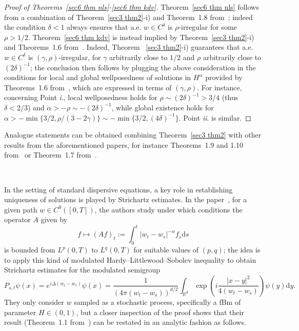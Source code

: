 \documentclass[10pt]{article}
\newcommand{\assign}{:=}
\newcommand{\mathd}{\mathrm{d}}
\begin{document}
\begin{proof}[Proof of Theorems~\ref{sec6 thm nls}\mbox{-}\ref{sec6 thm kdv}]
  Theorem~\ref{sec6 thm nls} follows from a combination of Theorem~\ref{sec3
  thm2}-i) and Theorem~1.8 from~{\cite{choukgubinelli1}}; indeed the condition
  $\delta < 1$ always ensures that a.e. $w \in C^{\delta}$ is $\rho$-irregular
  for some $\rho > 1 / 2$. Theorem~\ref{sec6 thm kdv} is instead implied by
  Theorem~\ref{sec3 thm2}-i) and Theorems~1.6 from~{\cite{choukgubinelli2}}.
  Indeed, Theorem ~\ref{sec3 thm2}-i) guarantees that a.e. $w\in C^\delta$ is $(\gamma,\rho)$-irregular, for $\gamma$ arbitrarily close to $1/2$ and $\rho$ arbitrarily close to $(2\delta)^{-1}$; the conclusion then follows by plugging the above consideration in the conditions for local and global wellposedness of solutions in $H^\alpha$ provided by Theorems~1.6 from~{\cite{choukgubinelli2}}, which are expressed in terms of $(\gamma,\rho)$.
  For instance, concerning Point \textit{i}., local wellposedness holds for $\rho\sim (2\delta)^{-1}>3/4$ (thus $\delta<2/3$) and $\alpha>-\rho\sim -(2\delta)^{-1}$, while global existence holds for $\alpha> -\min\{3/2,\rho/(3-2\gamma)\}\sim -\min\{3/2,(4\delta)^{-1}\}$. Point \textit{ii}. is similar.
\end{proof}

Analogue statements can be obtained combining Theorem~\ref{sec3 thm2} with
other results from the aforementioned papers, for instance Theorems~1.9 and
1.10 from~{\cite{choukgubinelli1}} or Theorem~1.7
from~{\cite{choukgubinelli2}}.

\

In the setting of standard dispersive equations, a key role in establishing
uniqueness of solutions is played by Strichartz estimates. In the
paper~{\cite{duboscq}}, for a given path $w \in C^0 ([0, T])$, the authors
study under which conditions the operator $A$ given by
\[ f \mapsto (A f)_t \assign \int_0^t | w_t - w_s |^{- \alpha} f_s \mathd s \]
is bounded from $L^p (0, T)$ to $L^q (0, T)$ for suitable values of $(p, q)$;
the idea is to apply this kind of modulated Hardy--Littlewood--Sobolev
inequality to obtain Strichartz estimates for the modulated semigroup
\[ P_{s, t} \psi (x) = e^{i \Delta (w_t - w_s)} \psi (x) = \frac{1}{(4 \pi
   (w_t - w_s))^{d / 2}} \int_{\mathbb{R}^d} \exp \left( i \frac{| x - y
   |^2}{4 (w_t - w_s)} \right) \psi (y) \mathd y. \]
They only consider $w$ sampled as a stochastic process, specifically a fBm of
parameter $H \in (0, 1)$, but a closer inspection of the proof shows that
their result (Theorem~1.1 from~{\cite{duboscq}}) can be restated in an
analytic fashion as follows.
\end{document}

